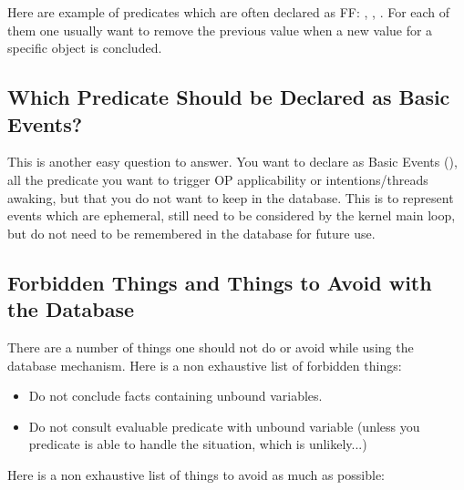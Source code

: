 Here are example of predicates which are often declared as FF:\*
, , . For each of them one
usually want to remove the previous value when a new value for a specific
object is concluded.

\subsection{Which Predicate Should be Declared as Basic Events?}

This is another easy question to answer. You want to declare as Basic
Events (), all the predicate you want to trigger OP
applicability or intentions/threads awaking, but that you do not want to
keep in the database. This is to represent events which are ephemeral,
still need to be considered by the kernel main loop, but do not need to
be remembered in the database for future use.

\subsection{Forbidden Things and Things to Avoid with the Database}

There are a number of things one should not do or avoid while using the
database mechanism. Here is a non exhaustive list of forbidden things:

\begin{itemize}

\item Do not conclude facts containing unbound variables.

\item Do not consult evaluable predicate with unbound variable (unless
you predicate is able to handle the situation, which is unlikely...)

\end{itemize}

Here is a non exhaustive list of things to avoid as much as possible:

